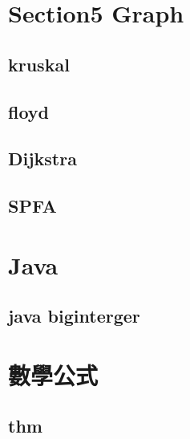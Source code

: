 \section{Section5 Graph}
    \subsection{kruskal}
        
    \subsection{floyd}
        
    \subsection{Dijkstra}
        
    \subsection{SPFA}
        

\section{Java}
    \subsection{java biginterger}
        

\section{數學公式}
    \subsection{thm}
        
        
